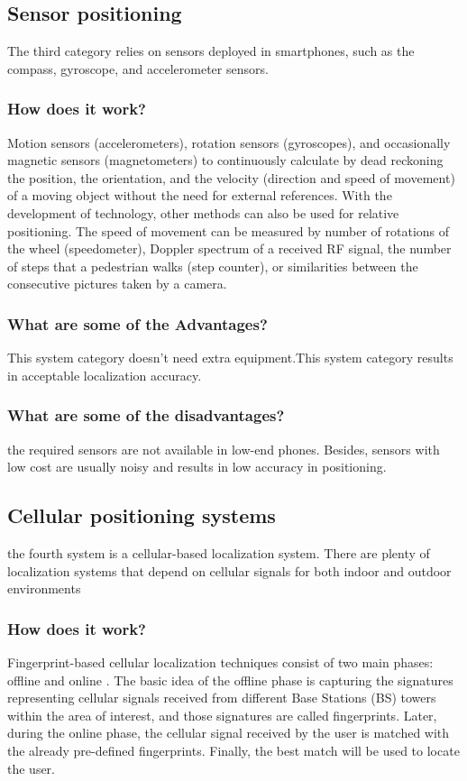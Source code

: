 \subsection{Sensor positioning}
The third category relies on sensors deployed in smartphones, such as the compass, gyroscope, and accelerometer sensors.
\subsubsection{How does it work?}
Motion sensors (accelerometers), rotation sensors (gyroscopes), and occasionally magnetic sensors (magnetometers) to continuously calculate by dead reckoning the position, the orientation, and the velocity (direction and speed of movement) of a moving object without the need for external references. With the development of technology, other methods can also be used for relative positioning. The speed of movement can be measured by number of rotations of the wheel (speedometer), Doppler spectrum of a received RF signal, the number of steps that a pedestrian walks (step counter), or similarities between the consecutive pictures taken by a camera.\cite{Ying19}
\subsubsection{What are some of the Advantages?}
This system category doesn't need extra equipment.This system category results in acceptable localization accuracy. 
\subsubsection{What are some of the disadvantages?}
the required sensors are not available in low-end phones. Besides, sensors with low cost are usually noisy and results in low accuracy in positioning.
\subsection{Cellular positioning systems}
the fourth system is a cellular-based localization system. There are plenty of localization systems that depend on cellular signals for both indoor and outdoor environments 
\subsubsection{How does it work?}
Fingerprint-based cellular localization techniques consist of two main phases: offline and online \cite{6062428}. The basic idea of the offline phase is capturing the signatures representing cellular signals received from different Base Stations (BS) towers within the area of interest, and those signatures are called fingerprints. Later, during the online phase, the cellular signal received by the user is matched with the already pre-defined fingerprints. Finally, the best match will be used to locate the user.
